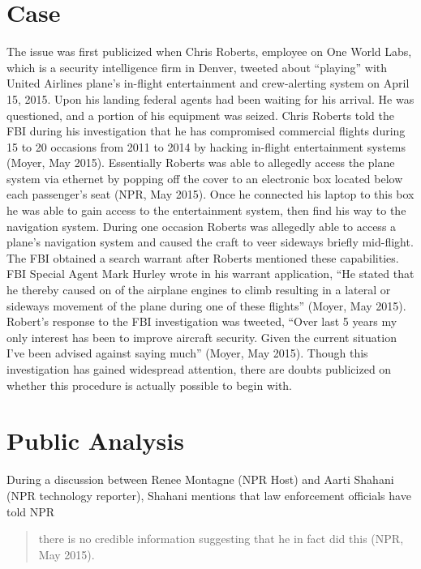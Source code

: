 \documentclass[notitlepage,a4paper,12pt]{article}
\begin{document}
\section*{Case}
The issue was first publicized when Chris Roberts, employee on One World Labs, which is a security intelligence firm in Denver, tweeted about “playing” with United Airlines plane’s in-flight entertainment and crew-alerting system on April 15, 2015. Upon his landing federal agents had been waiting for his arrival. He was questioned, and a portion of his equipment was seized. Chris Roberts told the FBI during his investigation that he has compromised commercial flights during 15 to 20 occasions from 2011 to 2014 by hacking in-flight entertainment systems (Moyer, May 2015). Essentially Roberts was able to allegedly access the plane system via ethernet by popping off the cover to an electronic box located below each passenger’s seat (NPR, May 2015). Once he connected his laptop to this box he was able to gain access to the entertainment system, then find his way to the navigation system. During one occasion Roberts was allegedly able to access a plane’s navigation system and caused the craft to veer sideways briefly mid-flight. The FBI obtained a search warrant after Roberts mentioned these capabilities. FBI Special Agent Mark Hurley wrote in his warrant application, “He stated that he thereby caused on of the airplane engines to climb resulting in a lateral or sideways movement of the plane during one of these flights” (Moyer, May 2015). Robert’s response to the FBI investigation was tweeted, “Over last 5 years my only interest has been to improve aircraft security. Given the current situation I’ve been advised against saying much” (Moyer, May 2015). Though this investigation has gained widespread attention, there are doubts publicized on whether this procedure is actually possible to begin with. 

\section*{Public Analysis}
During a discussion between Renee Montagne (NPR Host) and Aarti Shahani (NPR technology reporter), Shahani mentions that law enforcement officials have told NPR 

\begin{quote}
there is no credible information suggesting that he in fact did this (NPR, May 2015).
\end{quote}
\end{document}
